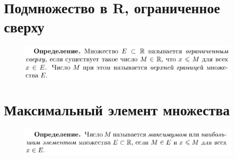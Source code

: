 \documentclass[12pt, a4paper]{article}
\begin{document}
\section{Подмножество в R, ограниченное сверху}
\begin{figure}[h]
    \centering
    \includegraphics[width=0.8\linewidth]{imagesMin/3.png}
\end{figure}
\section{Максимальный элемент множества}
\begin{figure}[h]
    \centering
    \includegraphics[width=0.8\linewidth]{imagesMin/4.png}
\end{figure}
\end{document}
